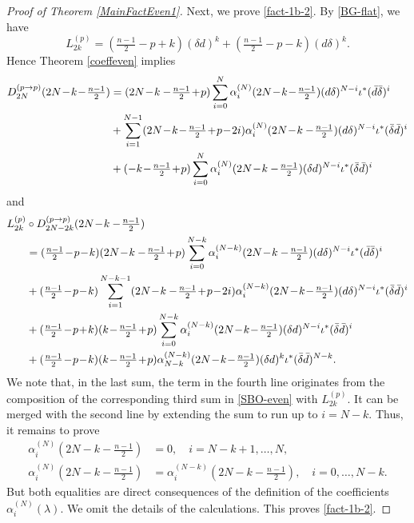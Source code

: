 \documentclass[a4paper,12pt,reqno]{amsart}
\numberwithin{theorem}{subsection}
\numberwithin{equation}{section}
\begin{document}
\begin{proof} [Proof of Theorem \ref{MainFactEven1}]
Next, we prove \eqref{fact-1b-2}. By \eqref{BG-flat}, we have
\begin{equation}\label{L-flat}
    L^{(p)}_{2k} = (\tfrac{n-1}{2}\!-\!p\!+\!k) (\delta{d})^k + (\tfrac{n-1}{2}\!-\!p\!-\!k)({d}\delta)^k.
\end{equation}
Hence Theorem \ref{coeffeven} implies
\begin{align*}
    D_{2N}^{(p\to p)} (2N\!-\!k\!-\!\tfrac{n-1}{2})
    & = (2N\!-\!k-\!\tfrac{n-1}{2}\!+\!p) \sum_{i=0}^N \alpha_i^{(N)}(2N\!-\!k\!-\!\tfrac{n-1}{2})
    ({d}\delta)^{N-i} \iota^* (\bar{d} \bar{\delta})^i  \notag \\
    & + \sum_{i=1}^{N-1} (2N\!-\!k\!-\!\tfrac{n-1}{2}\!+\!p\!-\!2i) \alpha_i^{(N)}(2N\!-\!k-\!\tfrac{n-1}{2})
    ({d} \delta)^{N-i} \iota^* (\bar{\delta} \bar{d})^i  \notag \\
    & + (-k\!-\!\tfrac{n-1}{2}\!+\!p) \sum_{i=0}^N  \alpha_i^{(N)}(2N\!-\!k-\!\tfrac{n-1}{2})
    (\delta {d})^{N-i} \iota^*(\bar{\delta} \bar{d})^i
\end{align*}
and
\begin{align*}
   L^{(p)}_{2k} & \circ D_{2N-2k}^{(p\to p)}(2N\!-\!k-\!\tfrac{n-1}{2}) \\
   & = (\tfrac{n-1}{2}\!-\!p\!-\!k)(2N\!-\!k-\!\tfrac{n-1}{2}\!+\!p)
   \sum_{i=0}^{N-k} \alpha_{i}^{(N-k)}(2N\!-\!k-\!\tfrac{n-1}{2})
   ({d}\delta)^{N-i} \iota^* (\bar{d} \bar{\delta})^i \notag \\
   & + (\tfrac{n-1}{2}\!-\!p\!-\!k) \sum_{i=1}^{N-k-1}
   (2N\!-\!k-\!\tfrac{n-1}{2}\!+\!p\!-\!2i)
   \alpha_{i}^{(N-k)}(2N\!-\!k\!-\!\tfrac{n-1}{2}) ({d} \delta)^{N-i} \iota^* (\bar{\delta} \bar{d})^i \notag\\
   & + (\tfrac{n-1}{2}\!-\!p\!+\!k) (k\!-\!\tfrac{n-1}{2}\!+\!p)
   \sum_{i=0}^{N-k} \alpha_{i}^{(N-k)}(2N\!-\!k\!-\!\tfrac{n-1}{2}) (\delta {d})^{N-i}
   \iota^*(\bar{\delta} \bar{d})^i \\
   & + (\tfrac{n-1}{2}\!-\!p\!-\!k) (k\!-\!\tfrac{n-1}{2}\!+\!p)
   \alpha_{N-k}^{(N-k)}(2N\!-\!k\!-\!\tfrac{n-1}{2}) (\delta {d})^{k} \iota^*(\bar{\delta}
   \bar{d})^{N-k}.
\end{align*}
We note that, in the last sum, the term in the fourth line originates from the
composition of the corresponding third sum in \eqref{SBO-even} with
$L^{(p)}_{2k}$. It can be merged with the second line by extending the sum to
run up to $i=N-k$. Thus, it remains to prove
\begin{align*}
    \alpha_i^{(N)}(2N\!-\!k\!-\!\tfrac{n-1}{2}) & = 0, \quad i=N-k+1,\dots,N, \\
    \alpha_i^{(N)}(2N\!-\!k\!-\!\tfrac{n-1}{2}) & = \alpha_i^{(N-k)}(2N\!-\!k-\!\tfrac{n-1}{2}), \quad i=0,\dots,N-k.
\end{align*}
But both equalities are direct consequences of the definition of the
coefficients $\alpha_i^{(N)}(\lambda)$. We omit the details of the
calculations. This proves \eqref{fact-1b-2}.


\end{proof}
\end{document}
